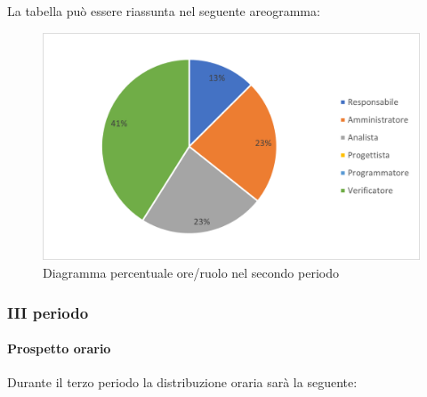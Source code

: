 La tabella può essere riassunta nel seguente areogramma:
\begin{figure}[H]
	\centering
	\includegraphics[width=0.8\linewidth]{res/images/preventivo/dettaglio_analisi/2-2.png}
	\caption{Diagramma percentuale ore/ruolo nel secondo periodo}
	\label{fig:diagramma costi ruolo secondo periodo analisi}
\end{figure}

\subsubsection{III periodo}
\paragraph{Prospetto orario}
Durante il terzo periodo la distribuzione oraria sarà la seguente:

